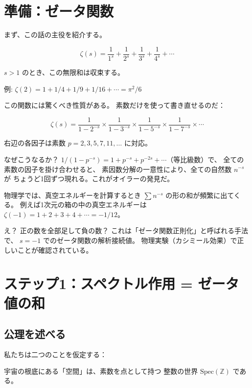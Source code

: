 \documentclass[11pt,a4paper]{article}
\begin{document}
\section{準備：ゼータ関数}

まず、この話の主役を紹介する。

\begin{mathbox}[リーマンゼータ関数]
$$\zeta(s) = \frac{1}{1^s} + \frac{1}{2^s} + \frac{1}{3^s} + \frac{1}{4^s} + \cdots$$

$s > 1$ のとき、この無限和は収束する。

例: $\zeta(2) = 1 + 1/4 + 1/9 + 1/16 + \cdots = \pi^2/6$
\end{mathbox}

この関数には驚くべき性質がある。
素数だけを使って書き直せるのだ：

\begin{mathbox}[オイラー積]
$$\zeta(s) = \frac{1}{1-2^{-s}} \times \frac{1}{1-3^{-s}} \times \frac{1}{1-5^{-s}} \times \frac{1}{1-7^{-s}} \times \cdots$$

右辺の各因子は素数 $p = 2, 3, 5, 7, 11, \ldots$ に対応。
\end{mathbox}

なぜこうなるか？
$1/(1-p^{-s}) = 1 + p^{-s} + p^{-2s} + \cdots$（等比級数）で、
全ての素数の因子を掛け合わせると、
素因数分解の一意性により、全ての自然数 $n^{-s}$ が
ちょうど1回ずつ現れる。これがオイラーの発見だ。

\begin{storybox}[物理との接点]
物理学では、真空エネルギーを計算するとき
$\sum n^{-s}$ の形の和が頻繁に出てくる。
例えば1次元の箱の中の真空エネルギーは
$\zeta(-1) = 1 + 2 + 3 + 4 + \cdots = -1/12$。

え？ 正の数を全部足して負の数？
これは「ゼータ関数正則化」と呼ばれる手法で、
$s = -1$ でのゼータ関数の解析接続値。
物理実験（カシミール効果）で正しいことが確認されている。
\end{storybox}

\section{ステップ1：スペクトル作用 = ゼータ値の和}

\subsection{公理を述べる}

私たちは二つのことを仮定する：

\begin{resultbox}[公理 I: 算術的時空]
宇宙の根底にある「空間」は、素数を点として持つ
整数の世界 $\text{Spec}(\mathbb{Z})$ である。
\end{resultbox}
\end{document}
